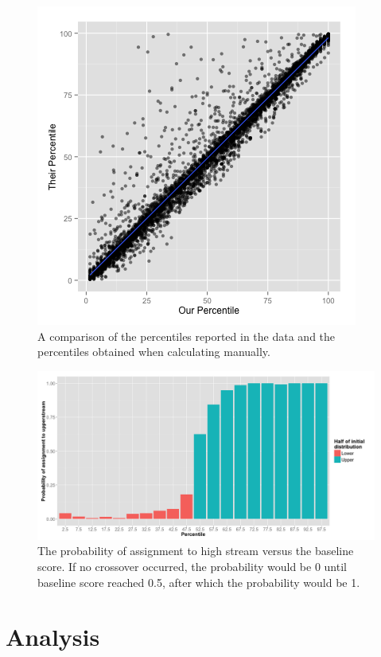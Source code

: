 \documentclass[11pt]{article}
\begin{document}
  \begin{figure}[H]
 \centering
 \includegraphics[scale=0.6]{Score_vs_Percentile.png}
 \caption{A comparison of the percentiles reported in the data and the percentiles obtained when calculating manually.}
 \label{fig:percentile}
 \end{figure} 
 
  
  \begin{figure}[H]
 \centering
 \includegraphics[scale=0.3]{tmt_assignment.png}
 \caption{The probability of assignment to high stream versus the baseline score. If no crossover occurred, the probability would be 0 until baseline score reached 0.5, after which the probability would be 1.}
 \label{fig:crossover}
 \end{figure} 
 
 
 \section{Analysis}
\end{document}
